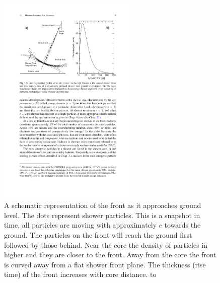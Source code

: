 \begin{figure}
    \centering
    \includegraphics[width=0.6\textwidth]
                    {plots/cosmic-rays/schematic_front}
    \caption{A schematic representation of the front as it approaches ground level. The dots represent shower particles. This is a snapshot in time, all particles are moving with approximately $c$ towards the ground. The particles on the front will reach the ground first followed by those behind. Near the core the density of particles in higher and they are closer to the front. Away from the core the front is curved away from a flat shower front plane. The thickness (rise time) of the front increases with core distance. \cite{grieder2010eas} to \cite{heck2013corsika}}
    \label{fig:schematic_front}
\end{figure}

